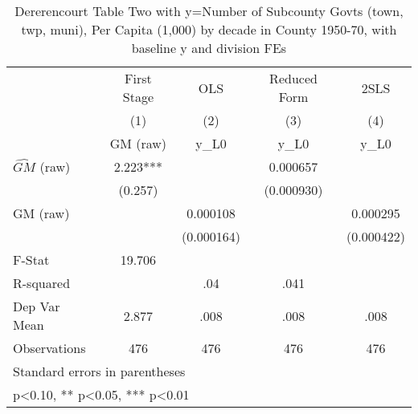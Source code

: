 \begin{table}[htbp]\centering
\def\sym#1{\ifmmode^{#1}\else\(^{#1}\)\fi}
\caption{Dererencourt Table Two with y=Number of Subcounty Govts (town, twp, muni), Per Capita (1,000) by decade in County 1950-70, with baseline y and division FEs}
\begin{tabular}{l*{4}{c}}
\toprule
                    & First Stage   &         OLS   &Reduced Form   &        2SLS   \\
                    &\multicolumn{1}{c}{(1)}&\multicolumn{1}{c}{(2)}&\multicolumn{1}{c}{(3)}&\multicolumn{1}{c}{(4)}\\
                    &\multicolumn{1}{c}{GM  (raw)}&\multicolumn{1}{c}{y\_L0}&\multicolumn{1}{c}{y\_L0}&\multicolumn{1}{c}{y\_L0}\\
\midrule
$\hat{GM}$ (raw)    &       2.223***&               &    0.000657   &               \\
                    &     (0.257)   &               &  (0.000930)   &               \\
\addlinespace
GM  (raw)           &               &    0.000108   &               &    0.000295   \\
                    &               &  (0.000164)   &               &  (0.000422)   \\
\midrule
F-Stat              &      19.706   &               &               &               \\
R-squared           &               &         .04   &        .041   &               \\
Dep Var Mean        &       2.877   &        .008   &        .008   &        .008   \\
Observations        &         476   &         476   &         476   &         476   \\
\bottomrule
\multicolumn{5}{l}{\footnotesize Standard errors in parentheses}\\
\multicolumn{5}{l}{\footnotesize * p<0.10, ** p<0.05, *** p<0.01}\\
\end{tabular}
\end{table}
